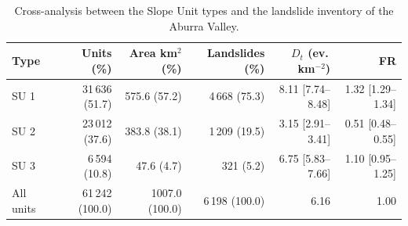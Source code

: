 \begin{table}[H]
    \centering
    \footnotesize
    \begin{tabular}{lrrrrr}
        \hline
        \textbf{Type} & \textbf{Units (\%)} & \textbf{Area km$^{2}$ (\%)} & \textbf{Landslides (\%)} & \textbf{$D_t$ (ev.\,km$^{-2}$)} & \textbf{FR} \\
        \hline
        SU 1 & 31\,636 (51.7) & 575.6 (57.2) & 4\,668 (75.3) & 8.11 [7.74--8.48] & 1.32 [1.29--1.34] \\
        SU 2 & 23\,012 (37.6) & 383.8 (38.1) & 1\,209 (19.5) & 3.15 [2.91--3.41] & 0.51 [0.48--0.55] \\
        SU 3 & 6\,594 (10.8) & 47.6 (4.7) & 321 (5.2) & 6.75 [5.83--7.66] & 1.10 [0.95--1.25] \\
        \hline
        All units & 61\,242 (100.0) & 1007.0 (100.0) & 6\,198 (100.0) & 6.16 & 1.00 \\
        \hline
    \end{tabular}
    \caption{Cross-analysis between the Slope Unit types and the landslide inventory of the Aburra Valley.}
    \label{tab:su_inventory}
\end{table}
